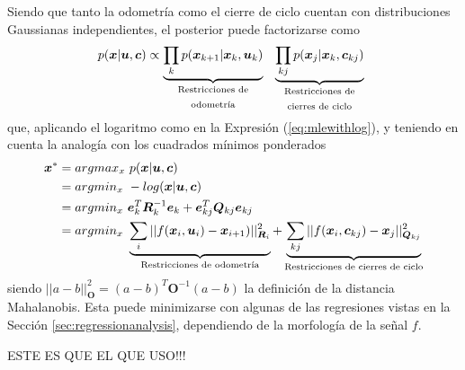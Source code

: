 Siendo que tanto la odometría como el cierre de ciclo cuentan con distribuciones Gaussianas independientes, el posterior puede factorizarse como
\begin{equation}
    p(\bm{x}|\bm{u},\bm{c}) \propto \underbrace{\prod_k p(\bm{x}_{k+1}|\bm{x}_{k},\bm{u}_k)}_{\text{\parbox{10em}{\centering Restricciones de odometría}}}\ \underbrace{\prod_{kj}p(\bm{x}_j|\bm{x}_k,\bm{c}_{kj})}_{\text{\parbox{10em}{\centering Restricciones de cierres de ciclo}}}
\end{equation}
que, aplicando el logaritmo como en la Expresión (\ref{eq:mlewithlog}), y teniendo en cuenta la analogía con los cuadrados mínimos ponderados
\begin{align}
    \bm{x}^* &= argmax_x\ p(\bm{x}|\bm{u},\bm{c}) \\
    &= argmin_x\ -log(\bm{x}|\bm{u},\bm{c}) \\
     &= argmin_x\ \bm{e}_k^T\bm{R}_k^{-1}\bm{e}_k + \bm{e}_{kj}^T\bm{Q}_{kj}\bm{e}_{kj} \\
     &= argmin_x\ \underbrace{\sum_{i} ||f(\bm{x}_i,\bm{u}_i)-\bm{x}_{i+1})||^2_{\bm{R}_i}}_{\text{{\centering Restricciones de odometría}}} + \underbrace{\sum_{kj} ||f(\bm{x}_i,\bm{c}_{kj}) - \bm{x}_{j}||^2_{\bm{Q}_{kj}}}_{\text{{\centering Restricciones de cierres de ciclo}}}
\end{align}
siendo $||a-b||^2_{\bm{O}} = (a - b)^T\bm{O}^{-1}(a-b)$ la definición de la distancia Mahalanobis. Esta puede minimizarse con algunas de las regresiones vistas en la Sección \ref{sec:regressionanalysis}, dependiendo de la morfología de la señal $f$.

\begin{huge}
ESTE ES QUE EL QUE USO!!!
\end{huge}

\fi